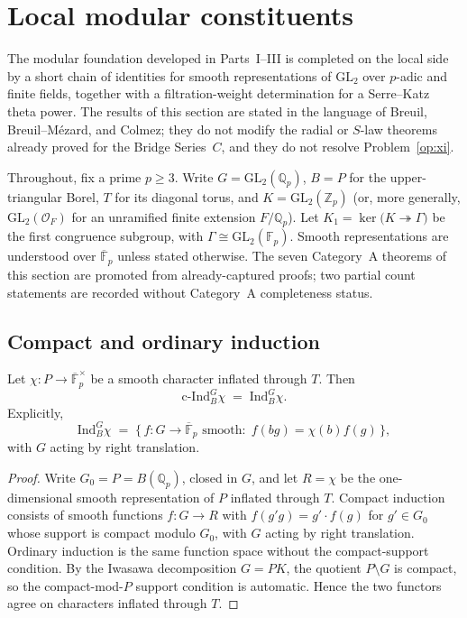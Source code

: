 \section{Local modular constituents}\label{sec:modlocal}
The modular foundation developed in Parts~I--III is completed on the local side by a short chain of identities for smooth representations of $\mathrm{GL}_2$ over $p$-adic and finite fields, together with a filtration-weight determination for a Serre--Katz theta power. The results of this section are stated in the language of Breuil, Breuil--M\'ezard, and Colmez; they do not modify the radial or $S$-law theorems already proved for the Bridge Series~$C$, and they do not resolve Problem~\ref{op:xi}.

Throughout, fix a prime $p\ge3$. Write $G=\mathrm{GL}_2(\mathbb{Q}_p)$, $B=P$ for the upper-triangular Borel, $T$ for its diagonal torus, and $K=\mathrm{GL}_2(\mathbb{Z}_p)$ (or, more generally, $\mathrm{GL}_2(\mathcal{O}_F)$ for an unramified finite extension $F/\mathbb{Q}_p$). Let $K_1=\ker\bigl(K\twoheadrightarrow\Gamma\bigr)$ be the first congruence subgroup, with $\Gamma\cong\mathrm{GL}_2(\mathbb{F}_p)$. Smooth representations are understood over $\overline{\mathbb{F}}_p$ unless stated otherwise. The seven Category~A theorems of this section are promoted from already-captured proofs; two partial count statements are recorded without Category~A completeness status.

\subsection{Compact and ordinary induction}
\begin{theorem}\label{thm:cind-ind}
Let $\chi\colon P\to\overline{\mathbb{F}}_p^\times$ be a smooth character inflated through $T$. Then
\[
\mathrm{c\text{-}Ind}_B^G\chi \;=\; \mathrm{Ind}_B^G\chi.
\]
Explicitly,
\[
\mathrm{Ind}_B^G\chi \;=\; \bigl\{\,f\colon G\to\overline{\mathbb{F}}_p\text{ smooth}:\; f(bg)=\chi(b)f(g)\,\bigr\},
\]
with $G$ acting by right translation.
\end{theorem}
\begin{proof}
Write $G_0=P=B(\mathbb{Q}_p)$, closed in $G$, and let $R=\chi$ be the one-dimensional smooth representation of $P$ inflated through $T$. Compact induction consists of smooth functions $f\colon G\to R$ with $f(g'g)=g'\cdot f(g)$ for $g'\in G_0$ whose support is compact modulo $G_0$, with $G$ acting by right translation. Ordinary induction is the same function space without the compact-support condition. By the Iwasawa decomposition $G=PK$, the quotient $P\setminus G$ is compact, so the compact-mod-$P$ support condition is automatic. Hence the two functors agree on characters inflated through $T$.
\end{proof}

